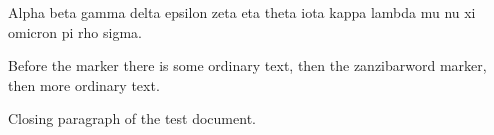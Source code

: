 Alpha beta gamma delta epsilon zeta eta theta iota kappa lambda mu nu xi omicron pi rho sigma.

Before the marker there is some ordinary text, then the zanzibarword marker, then more ordinary text.

Closing paragraph of the test document.
